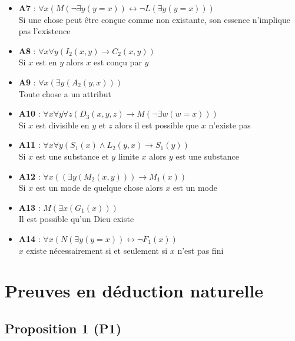 \documentclass[11pt,a4paper]{article}
\begin{document}
\begin{itemize}
    \item \textbf{A7} : $\forall x (M(\neg \exists y (y = x)) \leftrightarrow \neg L(\exists y (y = x)))$ \\
    Si une chose peut être conçue comme non existante, son essence n'implique pas l'existence
    
    \item \textbf{A8} : $\forall x \forall y (I_2(x,y) \rightarrow C_2(x,y))$ \\
    Si $x$ est en $y$ alors $x$ est conçu par $y$
    
    \item \textbf{A9} : $\forall x (\exists y (A_2(y,x)))$ \\
    Toute chose a un attribut
    
    \item \textbf{A10} : $\forall x \forall y \forall z (D_3(x,y,z) \rightarrow M(\neg \exists w (w = x)))$ \\
    Si $x$ est divisible en $y$ et $z$ alors il est possible que $x$ n'existe pas
    
    \item \textbf{A11} : $\forall x \forall y (S_1(x) \land L_2(y,x) \rightarrow S_1(y))$ \\
    Si $x$ est une substance et $y$ limite $x$ alors $y$ est une substance
    
    \item \textbf{A12} : $\forall x ((\exists y (M_2(x,y))) \rightarrow M_1(x))$ \\
    Si $x$ est un mode de quelque chose alors $x$ est un mode
    
    \item \textbf{A13} : $M(\exists x (G_1(x)))$ \\
    Il est possible qu'un Dieu existe
    
    \item \textbf{A14} : $\forall x (N(\exists y (y = x)) \leftrightarrow \neg F_1(x))$ \\
    $x$ existe nécessairement si et seulement si $x$ n'est pas fini
\end{itemize}

\section{Preuves en déduction naturelle}

\subsection{Proposition 1 (P1)}
\end{document}
